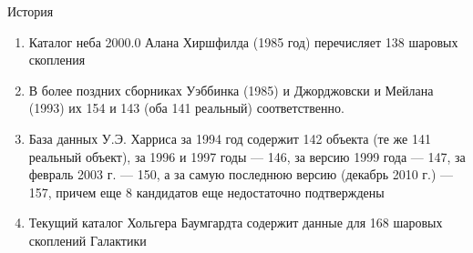 \documentclass{beamer}
\begin{document}
    \begin{frame}{История}
        \begin{enumerate}[]
            \item Каталог неба 2000.0  Алана Хиршфилда (1985 год) перечисляет 138 шаровых скопления
            \item В более поздних сборниках Уэббинка (1985) и Джорджовски и Мейлана (1993) их 154 и 143 (оба 141 реальный) соответственно.
            \item База данных У.Э. Харриса за 1994 год содержит 142 объекта (те же 141 реальный объект), за 1996 и 1997 годы — 146, за версию 1999 года — 147, за февраль 2003 г. — 150, а за самую последнюю версию (декабрь 2010 г.) — 157, причем еще 8 кандидатов еще недостаточно подтверждены
            \item Текущий каталог Хольгера Баумгардта содержит данные для 168 шаровых скоплений Галактики \cite{Baumgardt2023}
        \end{enumerate}
    \end{frame}
\end{document}
